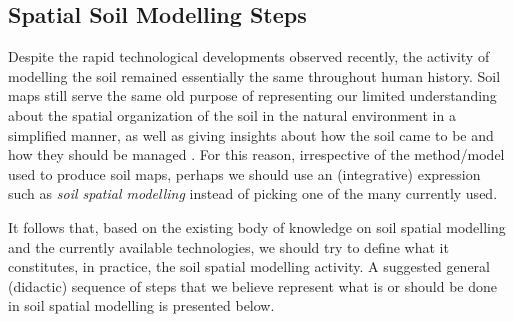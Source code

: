 
\subsection{Spatial Soil Modelling Steps}

Despite the rapid technological developments observed recently, the activity of modelling the soil remained 
essentially the same throughout human history. Soil maps still serve the same old purpose of representing our 
limited understanding about the spatial
organization of the soil in the natural environment in a simplified manner, as well as giving insights about 
how the soil came to be and how they should be managed \cite{Jenny1941, Hudson1992, Legros2006, 
Blanco-CanquiEtAl2010, Grunwald2010}. For this reason, irrespective of the method/model used to produce soil 
maps, perhaps we should use an (integrative) expression such as \emph{soil spatial modelling} instead of 
picking one of the many currently used.

It follows that, based on the existing body of knowledge on soil spatial modelling and the currently available 
technologies, we should try to define what it constitutes, in practice, the soil spatial modelling activity. A 
suggested general (didactic) sequence of steps that we believe represent what is or should be done in soil 
spatial modelling is presented below.

